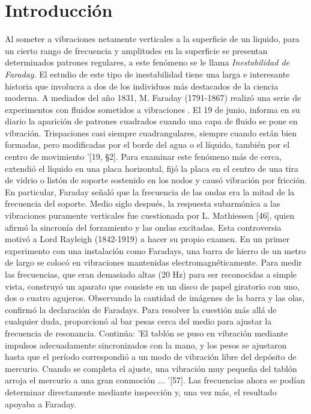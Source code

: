 \chapter*{Introducción}

Al someter a vibraciones netamente verticales a la superficie de un liquido, para un cierto rango de frecuencia y amplitudes en la superficie se presentan determinados patrones regulares, a este fenómeno se le llama \textit{Inestabilidad de Faraday}. El estudio de este tipo de inestabilidad tiene una larga e interesante historia que involucra a dos de los individuos más destacados de la ciencia moderna. A mediados del año 1831, M. Faraday (1791-1867) realizó una serie de experimentos con fluidos sometidos a vibraciones . El 19 de junio, informa en su diario la aparición de patrones cuadrados cuando una capa de fluido se pone en vibración. Trispaciones casi siempre cuadrangulares, siempre cuando están bien formadas, pero modificadas por el borde del agua o el líquido, también por el centro de movimiento '[19, §2]. Para examinar este fenómeno más de cerca, extendió el líquido en una placa horizontal, fijó la placa en el centro de una tira de vidrio o listón de soporte sostenido en los nodos y causó vibración por fricción. En particular, Faraday señaló que la frecuencia de las ondas era la mitad de la frecuencia del soporte. Medio siglo después, la respuesta subarmónica a las vibraciones puramente verticales fue cuestionada por L. Mathiessen [46], quien afirmó la sincronía del forzamiento y las ondas excitadas. Esta controversia motivó a Lord Rayleigh (1842-1919) a hacer su propio examen. En un primer experimento con una instalación como Faradays, una barra de hierro de un metro de largo se colocó en vibraciones mantenidas electromagnéticamente. Para medir las frecuencias, que eran demasiado altas (20 Hz) para ser reconocidas a simple vista, construyó un aparato que consiste en un disco de papel giratorio con uno, dos o cuatro agujeros. Observando la cantidad de imágenes de la barra y las olas, confirmó la declaración de Faradays. Para resolver la cuestión más allá de cualquier duda, proporcionó al bar pesas cerca del medio para ajustar la frecuencia de resonancia. Continúa: 'El tablón se puso en vibración mediante impulsos adecuadamente sincronizados con la mano, y los pesos se ajustaron hasta que el período correspondió a un modo de vibración libre del depósito de mercurio. Cuando se completa el ajuste, una vibración muy pequeña del tablón arroja el mercurio a una gran conmoción ... '[57]. Las frecuencias ahora se podían determinar directamente mediante inspección y, una vez más, el resultado apoyaba a Faraday.
